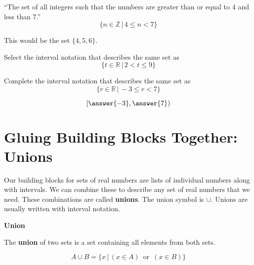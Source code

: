 \documentclass{ximera}
\begin{document}
\begin{example}
``The set of all integers such that the numbers are greater than or equal to 4 and less than 7.''
\[ \{ n \in \mathbb {Z} \, | \, 4 \leq n < 7 \} \]

\begin{explanation}
This would be the set $\{ 4, 5, 6 \}$.
\end{explanation}
\end{example}




\begin{question}
Select the interval notation that describes the same set as 
\[ \{ t \in \mathbb {R} \, | \, 2 < t \leq 9 \} \]
	\begin{multipleChoice}
	\choice {$[9, 2)$}
	\choice {$[2, 9)$}
	\choice [correct]{$(2, 9]$}
	\choice {$[2, 9]$}
	\end{multipleChoice}
\end{question}





\begin{question}
Complete the interval notation that describes the same set as 
\[ \{ r \in \mathbb {R} \, | \, -3 \leq r < 7 \} \]

\[
\left [ \answer{-3} , \answer{7} \right )
\]



\end{question}




















\section{Gluing Building Blocks Together: Unions}

Our building blocks for sets of real numbers are lists of individual numbers along with intervals.  We can combine these to describe any set of real numbers that we need.  These combinations are called \textbf{unions}.  The union symbol is $\cup$. Unions are usually written with interval notation.



\begin{definition} \textbf{\textcolor{green!50!black}{Union}}

The \textbf{union} of two sets is a set containing all elements from both sets.


\[
A \cup B = \{  x \, | \, (x \in A) \, \text{ or } \, (x \in B)  \}
\]


\end{definition}
\end{document}
